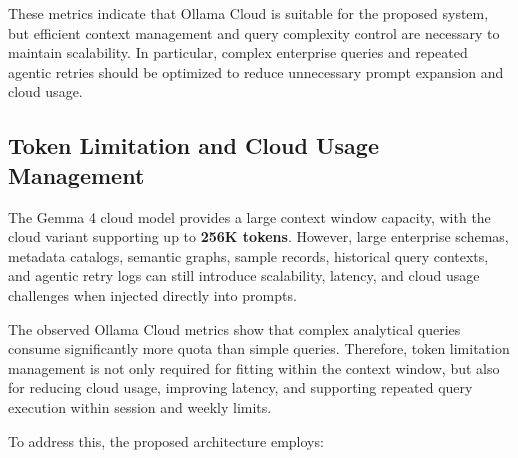 \documentclass[11pt,a4paper]{article}
\begin{document}
These metrics indicate that Ollama Cloud is suitable for the proposed system, but efficient context management and query complexity control are necessary to maintain scalability. In particular, complex enterprise queries and repeated agentic retries should be optimized to reduce unnecessary prompt expansion and cloud usage.

\subsection{Token Limitation and Cloud Usage Management}

The Gemma 4 cloud model provides a large context window capacity, with the cloud variant supporting up to \textbf{256K tokens}. However, large enterprise schemas, metadata catalogs, semantic graphs, sample records, historical query contexts, and agentic retry logs can still introduce scalability, latency, and cloud usage challenges when injected directly into prompts.

The observed Ollama Cloud metrics show that complex analytical queries consume significantly more quota than simple queries. Therefore, token limitation management is not only required for fitting within the context window, but also for reducing cloud usage, improving latency, and supporting repeated query execution within session and weekly limits.

To address this, the proposed architecture employs:
\end{document}
